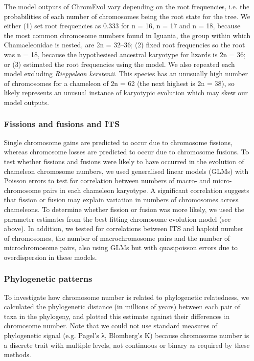 \documentclass[a4paper, 12pt]{article}
\begin{document}
The model outputs of ChromEvol vary depending on the root frequencies, i.e. the probabilities of each number of chromosomes being the root state for the tree. 
We either (1) set root frequencies as 0.333 for n = 16, n = 17 and n = 18, because the most common chromosome numbers found in Iguania, the group within which Chamaeleonidae is nested, are 2n = 32–36\cite{olmo2005chromorep}; (2) fixed root frequencies so the root was n = 18, because the hypothesised ancestral karyotype for lizards is 2n = 36\cite{deakin2016anchoring,lisachov2021whole,mezzasalma2021lizards}; or (3) estimated the root frequencies using the model. 
We also repeated each model excluding \textit{Rieppeleon kerstenii}. 
This species has an unusually high number of chromosomes for a chameleon of 2n = 62 (the next highest is 2n = 38), so likely represents an unusual instance of karyotypic evolution which may skew our model outputs. 

\subsubsection{Fissions and fusions and ITS}
Single chromosome gains are predicted to occur due to chromosome fissions, whereas chromosome losses are predicted to occur due to chromosome fusions. 
To test whether fissions and fusions were likely to have occurred in the evolution of chameleon chromosome numbers, we used generalised linear models (GLMs) with Poisson errors to test for correlation between numbers of macro- and micro-chromosome pairs in each chameleon karyotype. 
A significant correlation suggests that fission or fusion may explain variation in numbers of chromosomes across chameleons.
To determine whether fission or fusion was more likely, we used the parameter estimates from the best fitting chromosome evolution model (see above). 
In addition, we tested for correlations between ITS and haploid number of chromosomes, the number of macrochromosome pairs and the number of microchromosome pairs, also using GLMs but with quasipoisson errors due to overdispersion in these models.

\subsubsection{Phylogenetic patterns}
To investigate how chromosome number is related to phylogenetic relatedness, we calculated the phylogenetic distance (in millions of years) between each pair of taxa in the phylogeny, and plotted this estimate against their differences in chromosome number. 
Note that we could not use standard measures of phylogenetic signal (e.g. Pagel's λ\cite{pagel1999inferring}, Blomberg's K\cite{blomberg2003testing}) because chromosome number is a discrete trait with multiple levels, not continuous or binary as required by these methods. 
\end{document}
